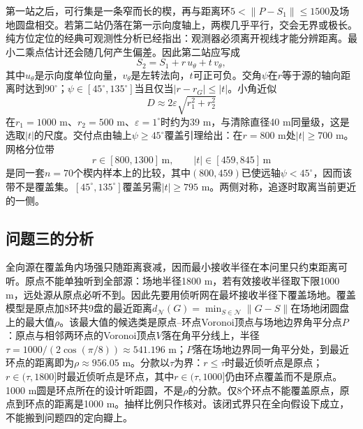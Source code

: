 \documentclass{cumcmthesis}
\begin{document}
第一站之后，可行集是一条窄而长的楔，再与距离环$5<\|P-S_1\|\le 1500$及场地圆盘相交。若第二站仍落在第一示向度轴上，两楔几乎平行，交会无界或极长。纯方位定位的经典可观测性分析已经指出：观测器必须离开视线才能分辨距离\cite{nardone1984}。最小二乘点估计还会随几何产生偏差\cite{dogancay2005}。因此第二站应写成
\begin{equation}
S_2=S_1+r\,u_{\theta}+t\,v_{\theta},
\label{eq:s2}
\end{equation}
其中$u_{\theta}$是示向度单位向量，$v_{\theta}$是左转法向，$t$可正可负。交角$\psi$在$r$等于源的轴向距离时达到$90^\circ$；$\psi\in[45^\circ,135^\circ]$当且仅当$|r-r_G|\le|t|$。小角近似
\begin{equation}
D\approx 2\varepsilon\sqrt{r_1^2+r_2^2}
\label{eq:smallang}
\end{equation}
在$r_1=1000$ m、$r_2=500$ m、$\varepsilon=1^\circ$时约为39 m，与清除直径40 m同量级，这是选取$|t|$的尺度。交付点由轴上$\psi\ge 45^\circ$覆盖引理给出：在$r=800$ m处$|t|\ge 700$ m。网格分位带
\[
r\in[800,1300]\,\mathrm{m},\qquad |t|\in[459,845]\,\mathrm{m}
\]
是同一套$n=70$个楔内样本上的比较，其中$(800,459)$已使远轴$\psi<45^\circ$，因而该带不是覆盖集。$[45^\circ,135^\circ]$覆盖另需$|t|\ge 795$ m。两侧对称，追逐时取离当前更近的一侧。

\subsection{问题三的分析}

全向源在覆盖角内场强只随距离衰减，因而最小接收半径在本问里只约束距离可听。原点不能单独听到全部源：场地半径1800 m，若有效接收半径取下限1000 m，远处源从原点必听不到。因此先要用侦听网在最坏接收半径下覆盖场地。覆盖模型是原点加8环共9盘的最近距离$d_{\mathcal{N}}(G)=\min_{S\in\mathcal{N}}\|G-S\|$在场地闭圆盘上的最大值$\rho$。该最大值的候选类是原点--环点Voronoi顶点与场地边界角平分点$P$：原点与相邻两环点的Voronoi顶点$V$落在角平分线上，半径$\tau=1000/(2\cos(\pi/8))\approx 541.196$ m；$P$落在场地边界同一角平分处，到最近环点的距离即为$\rho\approx 956.05$ m。分款以$\tau$为界：$r\le\tau$时最近侦听点是原点；$r\in(\tau,1800]$时最近侦听点是环点，其中$r\in(\tau,1000]$仍由环点覆盖而不是原点。1000 m圆是环点所在的设计听距圆，不是$\rho$的分款。仅8个环点不能覆盖原点，原点到环点的距离是1000 m。抽样比例只作核对。该闭式界只在全向假设下成立，不能搬到问题四的定向瓣上。
\end{document}
